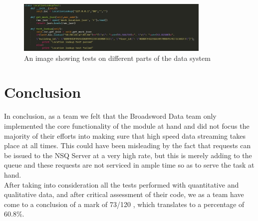 \documentclass{article}
\begin{document}
\begin{figure}[ht]
  \includegraphics[width=350px]{Images/Mock.jpg}
  \caption{An image showing tests on different parts of the data system}
  \label{An image showing test date to test different part of the data system}  
\end{figure}

\section{Conclusion}
\begin{flushleft}
In conclusion, as a team we felt that the Broadsword Data team only implemented the core functionality of the module at hand and did not focus the majority of their efforts into making sure that high speed data streaming takes place at all times. This could have been misleading by the fact that requests can be issued to the NSQ Server at a very high rate, but this is merely adding to the queue and these requests are not serviced in ample time so as to serve the task at hand. 
\\
After taking into consideration all the tests performed with quantitative and qualitative data, and after critical assessment of their code, we as a team have come to a conclusion of a mark of 73/120 , which translates to a percentage of 60.8\%. 
\end{flushleft}
\end{document}

